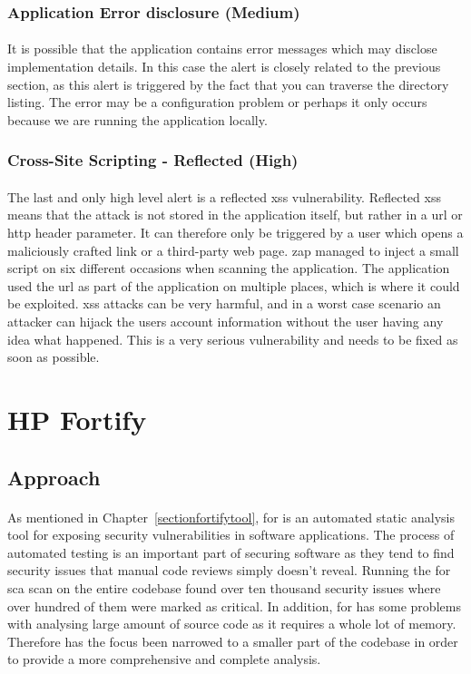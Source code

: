 \documentclass[11pt,english,a4paper]{report}
\begin{document}
\subsubsection{Application Error disclosure (Medium)}
\paragraph{}
It is possible that the application contains error messages which may disclose implementation details. 
In this case the alert is closely related to the previous section, as this alert is triggered by the fact that you can traverse the directory listing. 
The error may be a configuration problem or perhaps it only occurs because we are running the application locally.

\subsubsection{Cross-Site Scripting - Reflected (High)}
\paragraph{}
The last and only high level alert is a reflected \gls{xss} vulnerability. 
Reflected \gls{xss} means that the attack is not stored in the application itself, but rather in a \gls{url} or \gls{http} header parameter.
It can therefore only be triggered by a user which opens a maliciously crafted link or a third-party web page.
\gls{zap} managed to inject a small script on six different occasions when scanning the application.
The application used the \gls{url} as part of the application on multiple places, which is where it could be exploited.
\gls{xss} attacks can be very harmful, and in a worst case scenario an attacker can hijack the users account information without the user having any idea what happened.
This is a very serious vulnerability and needs to be fixed as soon as possible.


\section{HP Fortify}
\label{sec:hpfortify}
\subsection{Approach}
\paragraph{}
As mentioned in Chapter~\ref{sectionfortifytool}, \gls{for} is an automated static analysis tool for exposing security vulnerabilities in software applications. 
The process of automated testing is an important part of securing software as they tend to find security issues that manual code reviews simply doesn't reveal.
Running the \gls{for} \gls{sca} scan on the entire codebase found over ten thousand security issues where over hundred of them were marked as critical.
In addition, \gls{for} has some problems with analysing large amount of source code as it requires a whole lot of memory.
Therefore has the focus been narrowed to a smaller part of the codebase in order to provide a more comprehensive and complete analysis.
\end{document}

